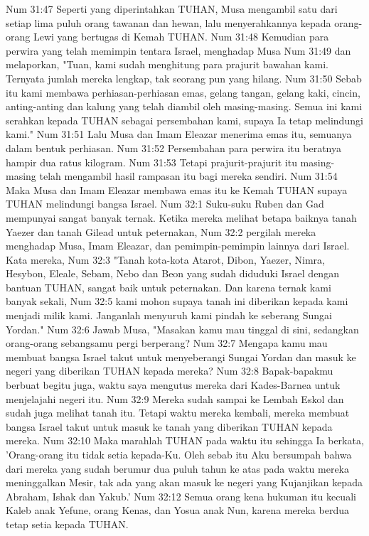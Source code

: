 Num 31:47  Seperti yang diperintahkan TUHAN, Musa mengambil satu dari setiap lima puluh orang tawanan dan hewan, lalu menyerahkannya kepada orang-orang Lewi yang bertugas di Kemah TUHAN.
Num 31:48  Kemudian para perwira yang telah memimpin tentara Israel, menghadap Musa
Num 31:49  dan melaporkan, "Tuan, kami sudah menghitung para prajurit bawahan kami. Ternyata jumlah mereka lengkap, tak seorang pun yang hilang.
Num 31:50  Sebab itu kami membawa perhiasan-perhiasan emas, gelang tangan, gelang kaki, cincin, anting-anting dan kalung yang telah diambil oleh masing-masing. Semua ini kami serahkan kepada TUHAN sebagai persembahan kami, supaya Ia tetap melindungi kami."
Num 31:51  Lalu Musa dan Imam Eleazar menerima emas itu, semuanya dalam bentuk perhiasan.
Num 31:52  Persembahan para perwira itu beratnya hampir dua ratus kilogram.
Num 31:53  Tetapi prajurit-prajurit itu masing-masing telah mengambil hasil rampasan itu bagi mereka sendiri.
Num 31:54  Maka Musa dan Imam Eleazar membawa emas itu ke Kemah TUHAN supaya TUHAN melindungi bangsa Israel.
Num 32:1  Suku-suku Ruben dan Gad mempunyai sangat banyak ternak. Ketika mereka melihat betapa baiknya tanah Yaezer dan tanah Gilead untuk peternakan,
Num 32:2  pergilah mereka menghadap Musa, Imam Eleazar, dan pemimpin-pemimpin lainnya dari Israel. Kata mereka,
Num 32:3  "Tanah kota-kota Atarot, Dibon, Yaezer, Nimra, Hesybon, Eleale, Sebam, Nebo dan Beon yang sudah diduduki Israel dengan bantuan TUHAN, sangat baik untuk peternakan. Dan karena ternak kami banyak sekali,
Num 32:5  kami mohon supaya tanah ini diberikan kepada kami menjadi milik kami. Janganlah menyuruh kami pindah ke seberang Sungai Yordan."
Num 32:6  Jawab Musa, "Masakan kamu mau tinggal di sini, sedangkan orang-orang sebangsamu pergi berperang?
Num 32:7  Mengapa kamu mau membuat bangsa Israel takut untuk menyeberangi Sungai Yordan dan masuk ke negeri yang diberikan TUHAN kepada mereka?
Num 32:8  Bapak-bapakmu berbuat begitu juga, waktu saya mengutus mereka dari Kades-Barnea untuk menjelajahi negeri itu.
Num 32:9  Mereka sudah sampai ke Lembah Eskol dan sudah juga melihat tanah itu. Tetapi waktu mereka kembali, mereka membuat bangsa Israel takut untuk masuk ke tanah yang diberikan TUHAN kepada mereka.
Num 32:10  Maka marahlah TUHAN pada waktu itu sehingga Ia berkata, 'Orang-orang itu tidak setia kepada-Ku. Oleh sebab itu Aku bersumpah bahwa dari mereka yang sudah berumur dua puluh tahun ke atas pada waktu mereka meninggalkan Mesir, tak ada yang akan masuk ke negeri yang Kujanjikan kepada Abraham, Ishak dan Yakub.'
Num 32:12  Semua orang kena hukuman itu kecuali Kaleb anak Yefune, orang Kenas, dan Yosua anak Nun, karena mereka berdua tetap setia kepada TUHAN.
